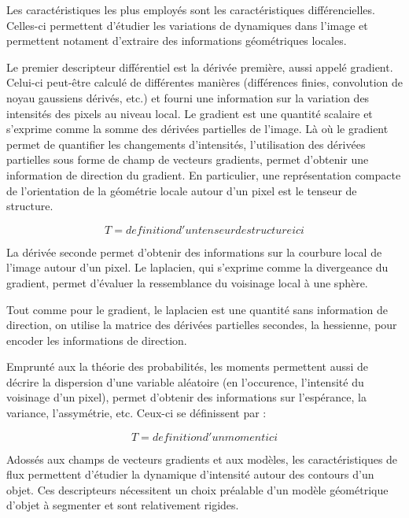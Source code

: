 Les caractéristiques les plus employés sont les caractéristiques différencielles. Celles-ci permettent d'étudier les variations de dynamiques dans l'image et permettent notament d'extraire des informations géométriques locales.

Le premier descripteur différentiel est la dérivée première, aussi appelé gradient. Celui-ci peut-être calculé de différentes manières (différences finies, convolution de noyau gaussiens dérivés, etc.) et fourni une information sur la variation des intensités des pixels au niveau local. Le gradient est une quantité scalaire et s'exprime comme la somme des dérivées partielles de l'image. Là où le gradient permet de quantifier les changements d'intensités, l'utilisation des dérivées partielles sous forme de champ de vecteurs gradients, permet d'obtenir une information de direction du gradient. En particulier, une représentation compacte de l'orientation de la géométrie locale autour d'un pixel est le tenseur de structure.

\begin{equation}
  T = definition d'un tenseur de structure ici
\end{equation}

La dérivée seconde permet d'obtenir des informations sur la courbure local de l'image autour d'un pixel. Le laplacien, qui s'exprime comme la divergeance du gradient, permet d'évaluer la ressemblance du voisinage local à une sphère. \cite{Wang2020_tensor_cut}

Tout comme pour le gradient, le laplacien est une quantité sans information de direction, on utilise la matrice des dérivées partielles secondes, la hessienne, pour encoder les informations de direction.

Emprunté aux la théorie des probabilités, les moments permettent aussi de décrire la dispersion d'une variable aléatoire (en l'occurence, l'intensité du voisinage d'un pixel), permet d'obtenir des informations sur l'espérance, la variance, l'assymétrie, etc. Ceux-ci se définissent par :

\begin{equation}
  T = definition d'un moment ici
\end{equation}

Adossés aux champs de vecteurs gradients et aux modèles, les caractéristiques de flux permettent d'étudier la dynamique d'intensité autour des contours d'un objet. Ces descripteurs nécessitent un choix préalable d'un modèle géométrique d'objet à segmenter et sont relativement rigides.

